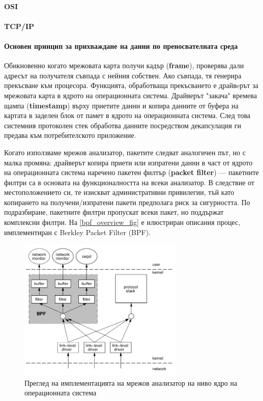 \documentclass[12pt,a4paper,oneside]{book}
\begin{document}
\paragraph{OSI}

\paragraph{TCP/IP}

\paragraph{Основен принцип за прихваждане на данни по преносвателната среда}


Обикновенно когато мрежовата карта получи кадър (\textbf{frame}), проверява дали адресът на
получателя съвпада с нейния собствен. Ако съвпада, тя генерира прекъсване към
процесора. Функцията, обработваща прекъсването е драйвeрът за мрежовата
карта в ядрото на операционната система. Драйверът "закача" времева щампа
(\textbf{timestamp}) върху приетите данни и копира данните от буфера на картата в заделен
блок от памет в ядрото на операционната система. След това системния протоколен
стек обработва данните посредством декапсулация ги предава към
потребителското приложение.

Когато използваме мрежов анализатор, пакетите следват аналогичен път, но с малка
промяна: драйверът копира приети или изпратени данни в част от ядрото на
операционната система наречено пакетен филтър (\textbf{packet filter}) --- пакетните
филтри са в основата на функционалността на всеки анализатор. В следствие от
местоположението си, те изискват административни привилегии, тъй като
копирането на получени/изпратени пакети предполага риск за сигурността. По подразбиране,
пакетните филтри пропускат всеки пакет, но поддържат комплексни филтри. 
На \autoref{bpf_overview_fig} е илюстриран описания процес, имплементиран с
Berkley Packet Filter (BPF).

\begin{figure}[h!]
  \centering
  \includegraphics[width=0.7\textwidth]{figures/bpf_overview.png}
  \caption{Преглед на имплементацията на мрежов анализатор на ниво ядро на
  операционната система}
  \label{bpf_overview_fig}
\end{figure}
\end{document}
